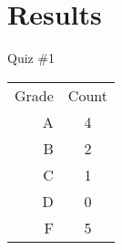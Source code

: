 
\section{Results}
\begin{frame}{Quiz \#1}
	\begin{tabular}{r || c}
		Grade	& Count	\\
		A		& 4		\\
		B		& 2		\\
		C		& 1		\\
		D		& 0 	\\
		F		& 5		\\
	\end{tabular}
\end{frame}
